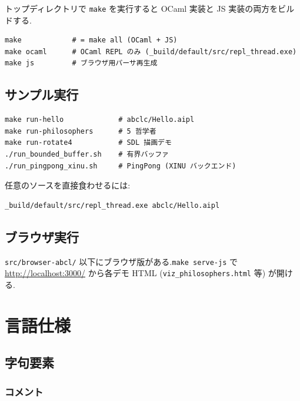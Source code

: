 \documentclass[11pt,a4paper]{article}
\begin{document}
トップディレクトリで \texttt{make} を実行すると OCaml 実装と JS 実装の両方をビルドする.

\begin{lstlisting}[language=shell]
make            # = make all (OCaml + JS)
make ocaml      # OCaml REPL のみ (_build/default/src/repl_thread.exe)
make js         # ブラウザ用パーサ再生成
\end{lstlisting}

\subsection{サンプル実行}

\begin{lstlisting}[language=shell]
make run-hello             # abclc/Hello.aipl
make run-philosophers      # 5 哲学者
make run-rotate4           # SDL 描画デモ
./run_bounded_buffer.sh    # 有界バッファ
./run_pingpong_xinu.sh     # PingPong (XINU バックエンド)
\end{lstlisting}

任意のソースを直接食わせるには:

\begin{lstlisting}[language=shell]
_build/default/src/repl_thread.exe abclc/Hello.aipl
\end{lstlisting}

\subsection{ブラウザ実行}

\texttt{src/browser-abcl/} 以下にブラウザ版がある.\texttt{make serve-js} で
\url{http://localhost:3000/} から各デモ HTML (\texttt{viz\_philosophers.html} 等) が開ける.

\section{言語仕様}

\subsection{字句要素}

\subsubsection*{コメント}
\end{document}
